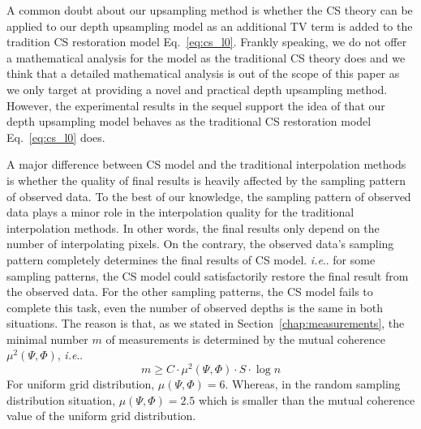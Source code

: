 \documentclass[preprint,10pt,5p,times,twocolumn]{elsarticle}
\makeatletter
\DeclareRobustCommand\onedot{\futurelet\@let@token\@onedot}
\def\@onedot{\ifx\@let@token.\else.\null\fi\xspace}
\def\ie{\emph{i.e}\onedot} \def\Ie{\emph{I.e}\onedot}
\makeatother
\begin{document}
A common doubt about our upsampling method is whether the CS theory can be applied to our depth upsampling model as an additional TV term is added to the tradition CS restoration model Eq.~\eqref{eq:cs_l0}. Frankly speaking, we do not offer a mathematical analysis for the model as the traditional CS theory does and we think that a detailed mathematical analysis is out of the scope of this paper as we only target at providing a novel and practical depth upsampling method. However, the experimental results in the sequel support the idea of that our depth upsampling model behaves as the traditional CS restoration model Eq.~\eqref{eq:cs_l0} does.

A major difference between CS model and the traditional interpolation methods is whether the quality of final results is heavily affected by the sampling pattern of observed data. To the best of our knowledge, the sampling pattern of observed data plays a minor role in the interpolation quality for the traditional interpolation methods. In other words, the final results only depend on the number of interpolating pixels. On the contrary, the observed data's sampling pattern completely determines the final results of CS model. \ie for some sampling patterns, the CS model could satisfactorily restore the final result from the observed data. For the other sampling patterns, the CS model fails to complete this task, even the number of observed depths is the same in both situations. The reason is that, as we stated in Section~\ref{chap:measurements}, the minimal number $m$ of measurements is determined by the mutual coherence $\mu^2(\Psi, \Phi)$, \ie
%
\begin{equation}
m \geq C \cdot \mu^2(\Psi, \Phi) \cdot S \cdot \log n
\end{equation}
%
For uniform grid distribution, $\mu(\Psi, \Phi) = 6$. Whereas, in the random sampling distribution situation, $\mu(\Psi, \Phi) = 2.5$ which is smaller than the mutual coherence value of the uniform grid distribution.
\end{document}
